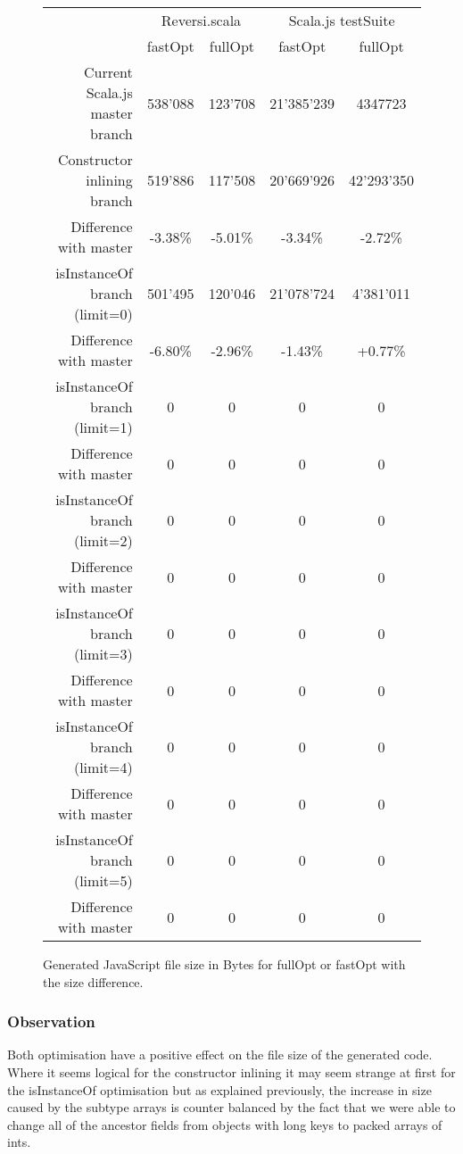 \begin{figure}[H]
  \centering
  \begin{tabular}{ | r | c | c | c | c | }\hline
    & \multicolumn{2}{|c|}{Reversi.scala} & \multicolumn{2}{|c|}{Scala.js
testSuite}\\
    & fastOpt & fullOpt & fastOpt & fullOpt\\ \hline
    Current Scala.js master branch & 538'088 & 123'708 & 21'385'239 &
4347723\\
\hline \hline
    Constructor inlining branch & 519'886 & 117'508 & 20'669'926 & 42'293'350\\
\hline
    Difference with master & -3.38\% & -5.01\% & -3.34\% & -2.72\%\\ \hline
\hline	
    isInstanceOf branch (limit=0)& 501'495 & 120'046 & 21'078'724 & 4'381'011\\
\hline
    Difference with master & -6.80\% & -2.96\% & -1.43\% & +0.77\%\\ \hline
\hline
    isInstanceOf branch (limit=1)& 0 & 0 & 0 & 0\\ \hline
    Difference with master & 0 & 0 & 0 & 0\\ \hline
\hline
    isInstanceOf branch (limit=2)& 0 & 0 & 0 & 0\\ \hline
    Difference with master & 0 & 0 & 0 & 0\\ \hline
\hline
    isInstanceOf branch (limit=3)& 0 & 0 & 0 & 0\\ \hline
    Difference with master & 0 & 0 & 0 & 0\\ \hline
\hline
    isInstanceOf branch (limit=4)& 0 & 0 & 0 & 0\\ \hline
    Difference with master & 0 & 0 & 0 & 0\\ \hline
\hline
    isInstanceOf branch (limit=5)& 0 & 0 & 0 & 0\\ \hline
    Difference with master & 0 & 0 & 0 & 0\\ \hline
    
  \end{tabular}
  \captionsetup{justification=centering}
  \caption{Generated JavaScript file size in Bytes for fullOpt or fastOpt with
the size difference.}
  \label{fig:file_size}
\end{figure}

\subsubsection{Observation}
Both optimisation have a positive effect on the file size of the generated
code. Where it seems logical for the constructor inlining it may seem
strange at first for the isInstanceOf optimisation but as explained previously,
the increase in size caused by the subtype arrays is counter balanced by the
fact that we were able to change all of the ancestor fields from objects with
long keys to packed arrays of ints.

